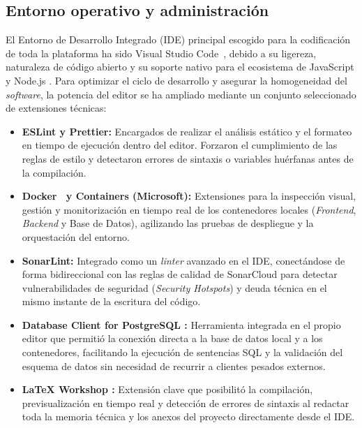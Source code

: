 \subsection{Entorno operativo y administración}
El Entorno de Desarrollo Integrado (IDE) principal escogido para la codificación de toda la plataforma ha sido Visual Studio Code~\cite{vscode}, debido a su ligereza, naturaleza de código abierto y su soporte nativo para el ecosistema de JavaScript y Node.js \cite{nodejs}. Para optimizar el ciclo de desarrollo y asegurar la homogeneidad del \textit{software}, la potencia del editor se ha ampliado mediante un conjunto seleccionado de extensiones técnicas:

\begin{itemize}
    \item \textbf{ESLint \cite{eslint} y Prettier:} Encargados de realizar el análisis estático y el formateo en tiempo de ejecución dentro del editor. Forzaron el cumplimiento de las reglas de estilo y detectaron errores de sintaxis o variables huérfanas antes de la compilación.
    \item \textbf{Docker~\cite{docker} y Containers (Microsoft):} Extensiones para la inspección visual, gestión y monitorización en tiempo real de los contenedores locales (\textit{Frontend}, \textit{Backend} y Base de Datos), agilizando las pruebas de despliegue y la orquestación del entorno.
    \item \textbf{SonarLint:} Integrado como un \textit{linter} avanzado en el IDE, conectándose de forma bidireccional con las reglas de calidad de SonarCloud \cite{sonarqube} para detectar vulnerabilidades de seguridad (\textit{Security Hotspots}) y deuda técnica en el mismo instante de la escritura del código.
    \item \textbf{Database Client for PostgreSQL \cite{postgresql}:} Herramienta integrada en el propio editor que permitió la conexión directa a la base de datos local y a los contenedores, facilitando la ejecución de sentencias SQL y la validación del esquema de datos sin necesidad de recurrir a clientes pesados externos.
    \item \textbf{LaTeX Workshop \cite{latexworkshop}:} Extensión clave que posibilitó la compilación, previsualización en tiempo real y detección de errores de sintaxis al redactar toda la memoria técnica y los anexos del proyecto directamente desde el IDE.
\end{itemize}


